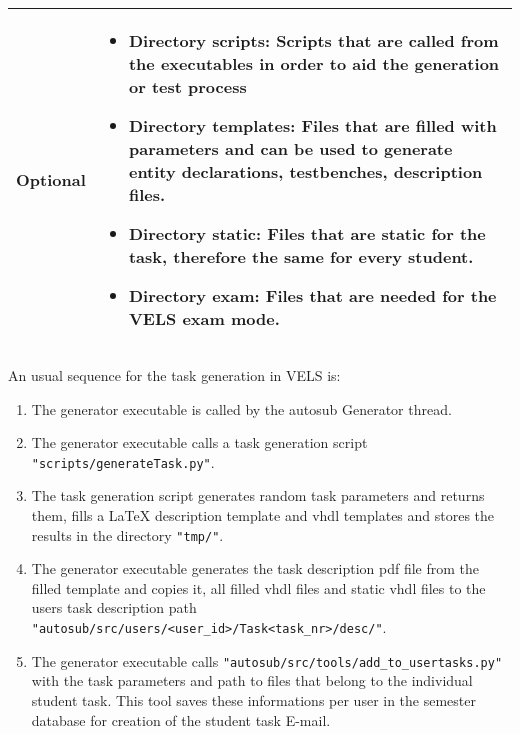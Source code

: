 \begin{tabular}{|p{3cm}|p{10cm}|}
\hline

Optional & \begin{itemize}
    \item {\bf Directory scripts:} Scripts that are called from the executables in order to aid the 
        generation or test process
    \item {\bf Directory templates:} Files that are filled with parameters and can be used to generate entity 
        declarations, testbenches, description files.
    \item {\bf Directory static:} Files that are static for the task, therefore the same for every student.
    \item {\bf Directory exam:} Files that are needed for the VELS exam mode.
\end{itemize} 
\\
\hline
\end{tabular} 

An usual sequence for the task generation in VELS is:
\begin{enumerate}
    \item The generator executable is called by the autosub Generator thread.
    \item The generator executable calls a task generation script
        {\tt "scripts/generateTask.py"}.
    \item The task generation script generates random task parameters and returns
        them, fills a LaTeX description template and vhdl templates and stores
        the results in the directory {\tt "tmp/"}.
    \item The generator executable generates the task description pdf file from the
        filled template and copies it, all filled vhdl files and static vhdl files
        to the users task description path {\tt "autosub/src/users/<user\_id>/Task<task\_nr>/desc/"}.
    \item The generator executable calls {\tt "autosub/src/tools/add\_to\_usertasks.py"} 
		with the task parameters and path to files that belong to the individual student task. 
		This tool saves these informations per user in the semester database for creation of the
		student task E-mail.
\end{enumerate}

